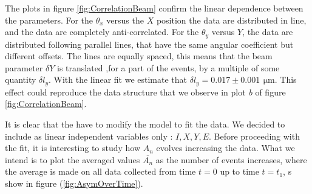 The plots in figure \ref{fig:CorrelationBeam} confirm the linear dependence between the parameters. For the $\theta_{x}$ versus the $X$ position the data are distributed in line, and the data are completely anti-correlated. For the $\theta_{y}$ versus $Y$, the data are distributed following parallel lines, that have the same angular coefficient but different offsets. The lines are equally spaced, this means that the beam parameter $\delta Y$ is translated ,for a part of the events, by a multiple of some quantity $\delta l_{y}$. With the linear fit we estimate that $\delta l_{y} = 0.017 \pm 0.001 \, \SI{}{\micro \meter}$. This effect could reproduce the data structure that we observe in plot \textit{b} of figure \ref{fig:CorrelationBeam}. 


It is clear that the have to modify the model to fit the data. We decided to include as linear independent variables only : $I,X,Y,E$. Before proceeding with the fit, it is interesting to study how $A_{n}$ evolves increasing the data. What we intend is to plot the averaged values $\overline{A_{n}}$ as the number of events increases, where the average is made on all data collected from time $t = 0$ up to time $t = t_{1}$, s show in figure (\ref{fig:AsymOverTime}). 

